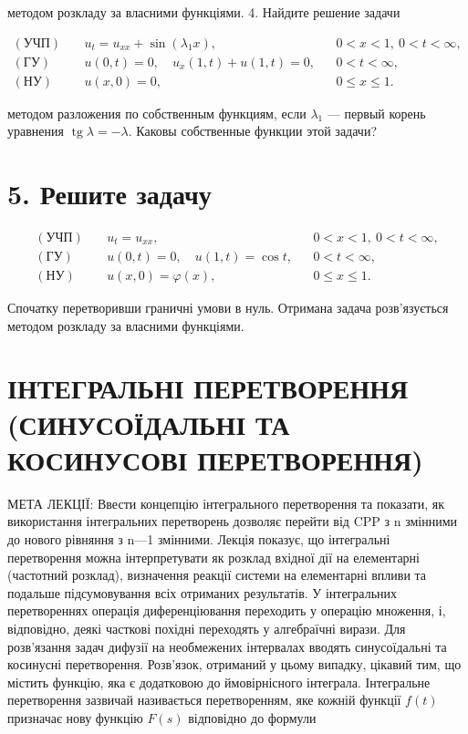 \documentclass[
  ukrainian,
]{article}
\begin{document}
методом розкладу за власними функціями. 4. Найдите решение задачи

\[
\begin{aligned}
(\text{УЧП})\quad & u_t = u_{xx} + \sin(\lambda_1 x), && 0 < x < 1,\ 0 < t < \infty, \\
(\text{ГУ})\quad & u(0,t) = 0,\quad u_x(1,t) + u(1,t) = 0, && 0 < t < \infty, \\
(\text{НУ})\quad & u(x,0) = 0, && 0 \leqslant x \leqslant 1.
\end{aligned}
\]

методом разложения по собственным функциям, если \(\lambda_1\) ---
первый корень уравнения \(\operatorname{tg}\lambda = -\lambda\). Каковы
собственные функции этой задачи?

\section{5. Решите
задачу}\label{ux440ux435ux448ux438ux442ux435-ux437ux430ux434ux430ux447ux443}

\[
\begin{aligned}
(\text{УЧП})\quad & u_t = u_{xx}, && 0 < x < 1,\ 0 < t < \infty, \\
(\text{ГУ})\quad & u(0,t) = 0,\quad u(1,t) = \cos t, && 0 < t < \infty, \\
(\text{НУ})\quad & u(x,0) = \varphi(x), && 0 \leqslant x \leqslant 1.
\end{aligned}
\]

Спочатку перетворивши граничні умови в нуль. Отримана задача
розв'язується методом розкладу за власними функціями.

\section{ІНТЕГРАЛЬНІ ПЕРЕТВОРЕННЯ (СИНУСОЇДАЛЬНІ ТА КОСИНУСОВІ
ПЕРЕТВОРЕННЯ)}\label{ux456ux43dux442ux435ux433ux440ux430ux43bux44cux43dux456-ux43fux435ux440ux435ux442ux432ux43eux440ux435ux43dux43dux44f-ux441ux438ux43dux443ux441ux43eux457ux434ux430ux43bux44cux43dux456-ux442ux430-ux43aux43eux441ux438ux43dux443ux441ux43eux432ux456-ux43fux435ux440ux435ux442ux432ux43eux440ux435ux43dux43dux44f}

МЕТА ЛЕКЦІЇ: Ввести концепцію інтегрального перетворення та показати, як
використання інтегральних перетворень дозволяє перейти від CPP з n
змінними до нового рівняння з n---1 змінними. Лекція показує, що
інтегральні перетворення можна інтерпретувати як розклад вхідної дії на
елементарні (частотний розклад), визначення реакції системи на
елементарні впливи та подальше підсумовування всіх отриманих
результатів. У інтегральних перетвореннях операція диференціювання
переходить у операцію множення, і, відповідно, деякі часткові похідні
переходять у алгебраїчні вирази. Для розв'язання задач дифузії на
необмежених інтервалах вводять синусоїдальні та косинусні перетворення.
Розв'язок, отриманий у цьому випадку, цікавий тим, що містить функцію,
яка є додатковою до ймовірнісного інтеграла. Інтегральне перетворення
зазвичай називається перетворенням, яке кожній функції \(f(t)\)
призначає нову функцію \(F(s)\) відповідно до формули
\end{document}
